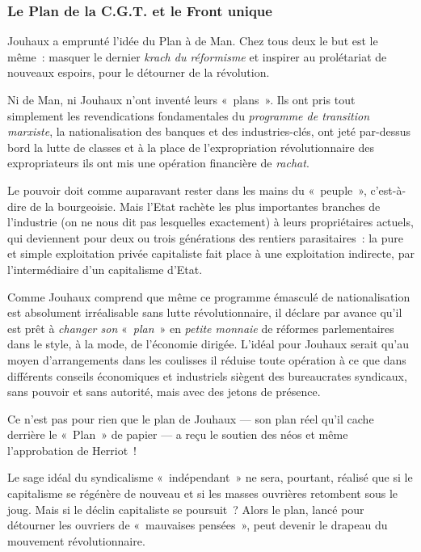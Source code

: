 \documentclass[french,twoside]{book} %
\begin{document}
\subsubsection[{Le Plan de la C.G.T. et le Front unique}]{Le Plan de la C.G.T. et le Front unique}
\noindent Jouhaux a emprunté l’idée du Plan à de Man. Chez tous deux le but est le même : masquer le dernier \emph{krach  du réformisme} et inspirer au prolétariat de nouveaux espoirs, pour le détourner de la révolution.\par
Ni de Man, ni Jouhaux n’ont inventé leurs « plans ». Ils ont pris tout simplement les revendications fondamentales du \emph{programme de transition marxiste}, la nationalisation des banques et des industries-clés, ont jeté par-dessus bord la lutte de classes et à la place de l’expropriation révolutionnaire des expropriateurs ils ont mis une opération financière de \emph{rachat}.\par
Le pouvoir doit comme auparavant rester dans les mains du « peuple », c’est-à-dire de la bourgeoisie. Mais l’Etat rachète les plus importantes branches de l’industrie (on ne nous dit pas lesquelles exactement) à leurs propriétaires actuels, qui deviennent pour deux ou trois générations des rentiers parasitaires : la pure et simple exploitation privée capitaliste fait place à une exploitation indirecte, par l’intermédiaire d’un capitalisme d’Etat.\par
Comme Jouhaux comprend que même ce programme émasculé de nationalisation est absolument irréalisable sans lutte révolutionnaire, il déclare par avance qu’il est prêt à \emph{changer son} « \emph{plan} » en \emph{petite monnaie} de réformes parlementaires dans le style, à la mode, de l’économie dirigée. L’idéal pour Jouhaux serait qu’au moyen d’arrangements dans les coulisses il réduise toute opération à ce que dans différents conseils économiques et industriels siègent des bureaucrates syndicaux, sans pouvoir et sans autorité, mais avec des jetons de présence.\par
Ce n’est pas pour rien que le plan de Jouhaux — son plan réel qu’il cache derrière le « Plan » de papier — a reçu le soutien des néos et même l’approbation de Herriot !\par
Le sage idéal du syndicalisme « indépendant » ne sera, pourtant, réalisé que si le capitalisme se régénère de nouveau et si les masses ouvrières retombent sous le joug. Mais si le déclin capitaliste se poursuit ? Alors le  plan, lancé pour détourner les ouvriers de « mauvaises pensées », peut devenir le drapeau du mouvement révolutionnaire.\par
\end{document}
